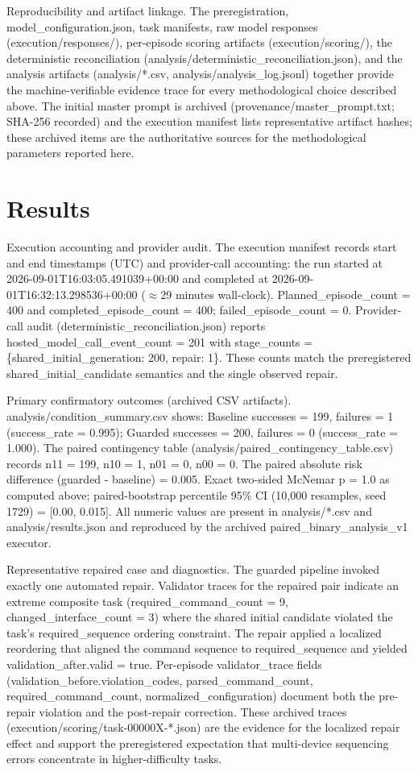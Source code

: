 \documentclass[conference]{IEEEtran}
\begin{document}
Reproducibility and artifact linkage. The preregistration, model\_configuration.json, task manifests, raw model responses (execution/responses/), per-episode scoring artifacts (execution/scoring/), the deterministic reconciliation (analysis/deterministic\_reconciliation.json), and the analysis artifacts (analysis/*.csv, analysis/analysis\_log.jsonl) together provide the machine-verifiable evidence trace for every methodological choice described above. The initial master prompt is archived (provenance/master\_prompt.txt; SHA-256 recorded) and the execution manifest lists representative artifact hashes; these archived items are the authoritative sources for the methodological parameters reported here.

\section{Results}
Execution accounting and provider audit. The execution manifest records start and end timestamps (UTC) and provider-call accounting: the run started at 2026-09-01T16:03:05.491039+00:00 and completed at 2026-09-01T16:32:13.298536+00:00 (\ensuremath{\approx}29 minutes wall-clock). Planned\_episode\_count = 400 and completed\_episode\_count = 400; failed\_episode\_count = 0. Provider-call audit (deterministic\_reconciliation.json) reports hosted\_model\_call\_event\_count = 201 with stage\_counts = \{shared\_initial\_generation: 200, repair: 1\}. These counts match the preregistered shared\_initial\_candidate semantics and the single observed repair.

Primary confirmatory outcomes (archived CSV artifacts). analysis/condition\_summary.csv shows: Baseline successes = 199, failures = 1 (success\_rate = 0.995); Guarded successes = 200, failures = 0 (success\_rate = 1.000). The paired contingency table (analysis/paired\_contingency\_table.csv) records n11 = 199, n10 = 1, n01 = 0, n00 = 0. The paired absolute risk difference (guarded - baseline) = 0.005. Exact two-sided McNemar p = 1.0 as computed above; paired-bootstrap percentile 95\% CI (10,000 resamples, seed 1729) = [0.00, 0.015]. All numeric values are present in analysis/*.csv and analysis/results.json and reproduced by the archived paired\_binary\_analysis\_v1 executor.

Representative repaired case and diagnostics. The guarded pipeline invoked exactly one automated repair. Validator traces for the repaired pair indicate an extreme composite task (required\_command\_count = 9, changed\_interface\_count = 3) where the shared initial candidate violated the task's required\_sequence ordering constraint. The repair applied a localized reordering that aligned the command sequence to required\_sequence and yielded validation\_after.valid = true. Per-episode validator\_trace fields (validation\_before.violation\_codes, parsed\_command\_count, required\_command\_count, normalized\_configuration) document both the pre-repair violation and the post-repair correction. These archived traces (execution/scoring/task-00000X-*.json) are the evidence for the localized repair effect and support the preregistered expectation that multi-device sequencing errors concentrate in higher-difficulty tasks.
\end{document}
